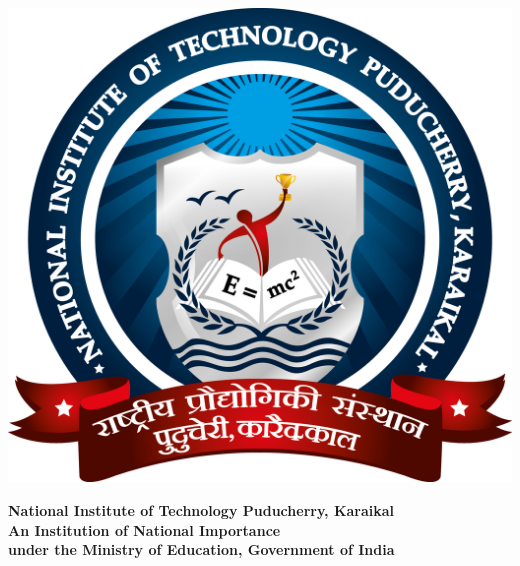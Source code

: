 \documentclass[9pt,a4paper,onecolumn,portrait]{article}
\begin{document}
	
	\begin{table}[t]
		\begin{tabular}{c}
			
		\end{tabular}
	\end{table}
	
	\begin{minipage}{0.15\linewidth}
		\centering
		\includegraphics[scale=0.12]{NITPYlogo.png}
	\end{minipage}
	\begin{minipage}{0.75\linewidth}
		\Large
		\centering
		{\color[cmyk]{0.88,0,0.94,0.27}\textbf{National Institute of Technology Puducherry, Karaikal}}\\
		\large
		\vspace{0.15cm}
		{\color{red}\textbf{An Institution of National Importance}\\
		\textbf{under the Ministry of Education, Government of India}}
	\end{minipage}
	
	\vspace{0.1cm}
	
\end{document}
